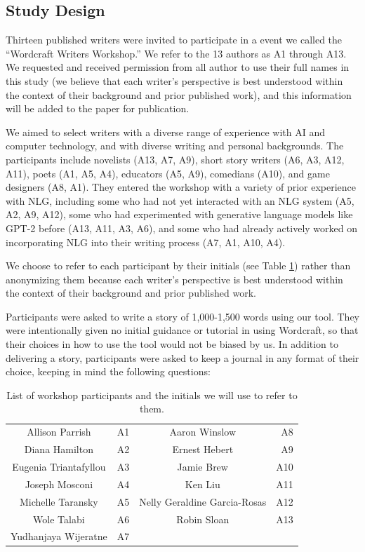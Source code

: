 % 

\subsection{Study Design}
Thirteen published writers were invited to participate in a event we called the ``Wordcraft Writers Workshop.''
We refer to the 13 authors as A1 through A13.
We requested and received permission from all author to use their full names in this study (we believe that each writer's perspective is best understood within the context of their background and prior published work), and this information will be added to the paper for publication.


We aimed to select writers with a diverse range of experience with AI and computer technology, and with diverse writing and personal backgrounds.
The participants include novelists (A13, A7, A9), short story writers (A6, A3, A12, A11), poets (A1, A5, A4), educators (A5, A9), comedians (A10), and game designers (A8, A1).
They entered the workshop with a variety of prior experience with NLG, including some who had not yet interacted with an NLG system (A5, A2, A9, A12), some who had experimented with generative language models like GPT-2 before (A13, A11, A3, A6), and some who had already actively worked on incorporating NLG into their writing process (A7, A1, A10, A4).

We choose to refer to each participant by their initials (see Table \ref{tab:writer_initials}) rather than anonymizing them because each writer's perspective is best understood within the context of their background and prior published work.


Participants were asked to write a story of 1,000-1,500 words using our tool.
They were intentionally given no initial guidance or tutorial in using Wordcraft, so that their choices in how to use the tool would not be biased by us.
In addition to delivering a story, participants were asked to keep a journal in any format of their choice, keeping in mind the following questions:

\begin{table}[t]
    \centering
    \small
    \caption{List of workshop participants and the initials we will use to refer to them.}
    \begin{tabular}{cr|cr}
    \hline
Allison Parrish & A1 & Aaron Winslow & A8 \\
Diana Hamilton & A2 & Ernest Hebert & A9 \\
Eugenia Triantafyllou & A3 & Jamie Brew & A10 \\
Joseph Mosconi & A4 & Ken Liu & A11 \\
Michelle Taransky & A5 & Nelly Geraldine Garcia-Rosas & A12 \\
Wole Talabi & A6 & Robin Sloan & A13 \\
Yudhanjaya Wijeratne & A7 & & \\
\hline
    \end{tabular}
    \label{tab:writer_initials}
\end{table}


